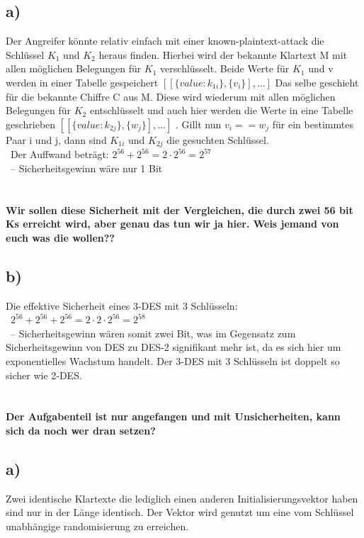 \documentclass[ngerman]{fbi-aufgabenblatt}
\begin{document}
	\setcounter{section}{0}

	
	\subsection*{a)}
	Der Angreifer könnte relativ einfach mit einer known-plaintext-attack die Schlüssel $K_{1}$ und $K_{2}$ heraus finden.
	Hierbei wird der bekannte Klartext M mit allen möglichen Belegungen für $K_{1}$ verschlüsselt. Beide Werte für $K_{1}$ und v werden in einer Tabelle gespeichert $[[\{value: k_{1i}\} ,\{v_{i}\}], ... ]$ Das selbe geschieht für die bekannte Chiffre C aus M. Diese wird wiederum mit allen möglichen Belegungen für $K_{2}$ entschlüsselt und auch hier werden die Werte in eine Tabelle geschrieben $[[\{value: k_{2j}\} ,\{w_{j}\}], ... ]$ . Gillt nun $v_{i} == w_{j}$ für ein bestimmtes Paar i und j, dann sind $K_{1i}$ und $K_{2j}$ die gesuchten Schlüssel.\\\
	Der Auffwand beträgt:
	$2^{56}+2^{56} =2\cdot 2^{56} =2^{57}$\\\
	–  Sicherheitsgewinn wäre nur 1 Bit
	\\\\\\
	 \textbf{Wir sollen diese Sicherheit mit der Vergleichen, die durch zwei 56 bit Ks erreicht wird, aber genau das tun wir ja hier. Weis jemand von euch was die wollen??}
		
	\subsection*{b)}
	Die effektive Sicherheit eines 3-DES mit 3 Schlüsseln:\\\
	$2^{56}+2^{56}+2^{56} =2\cdot 2\cdot 2^{56} =2^{58}$\\\
	–  Sicherheitsgewinn wären somit zwei Bit, was im Gegensatz zum Sicherheitsgewinn von DES zu DES-2 signifikant mehr ist, da es sich hier um exponentielles Wachstum handelt. Der 3-DES mit 3 Schlüsseln ist doppelt so sicher wie
	 2-DES.
	 	\\\\\\
	 \textbf{Der Aufgabenteil ist nur angefangen und mit Unsicherheiten, kann sich da noch wer dran setzen?}
		
    
	\aufgabe{Cipher-Block-Chaining-Modus}
	
	\subsection*{a)}
	Zwei identische Klartexte die lediglich einen anderen Initialisierungsvektor haben sind nur in der Länge identisch.
	Der Vektor wird genutzt um eine vom Schlüssel unabhängige randomisierung zu erreichen.
	
\end{document}
